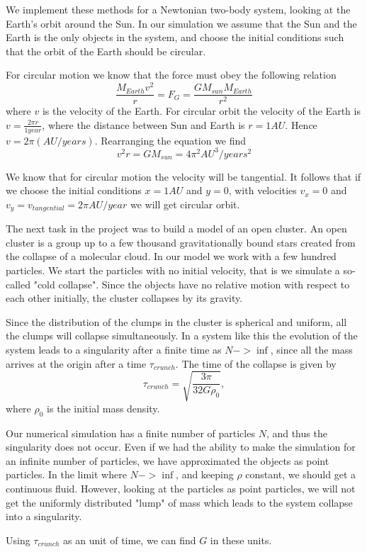 \documentclass[a4paper,12pt, english]{article}
\begin{document}
We implement these methods for a Newtonian two-body system, looking at the Earth's orbit around the Sun. In our simulation we assume that the Sun and the Earth is the only objects in the system, and choose the initial conditions such that the orbit of the Earth should be circular.

For circular motion we know that the force must obey the following relation
$$\frac{M_{Earth}v^2}{r} = F_G = \frac{GM_{sun}M_{Earth}}{r^2}$$ where $v$ is the velocity of the Earth.
For circular orbit the velocity of the Earth is $v = \frac{2 \pi r}{1 year}$, where the distance between Sun and Earth is $r = 1 AU$. Hence $v = 2 \pi (AU/years)$. Rearranging the equation we find
$$v^2r = GM_{sun} = 4 \pi ^2 AU^3/years^2$$

We know that for circular motion the velocity will be tangential. It follows that if we choose the initial conditions $ x = 1 AU $ and $ y = 0$, with velocities $v_x = 0$ and $v_y = v_{tangential} = 2 \pi AU/year$ we will get circular orbit.

The next task in the project was to build a model of an open cluster. An open cluster is a group up to a few thousand gravitationally bound stars created from the collapse of a molecular cloud. In our model we work with a few hundred particles. We start the particles with no initial velocity, that is we simulate a so-called "cold collapse". Since the objects have no relative motion with respect to each other initially, the cluster collapses by its gravity.

Since the distribution of the clumps in the cluster is spherical and uniform, all the clumps will collapse simultaneously.
In a system like this the evolution of the system leads to a singularity after a finite time as $N -> \inf$, since all the mass arrives at the origin after a time $\tau_{crunch}$. The time of the collapse is given by $$\tau_{crunch} = \sqrt{\frac{3 \pi}{32G \rho_0}},$$ where $\rho_0$ is the initial mass density.

Our numerical simulation has a finite number of particles $N$, and thus the singularity does not occur. Even if we had the ability to make the simulation for an infinite number of particles, we have approximated the objects as point particles. In the limit where $N -> \inf$, and keeping $\rho$ constant, we should get a continuous fluid. However, looking at the particles as point particles, we will not get the uniformly distributed "lump" of mass which leads to the system collapse into a singularity.

Using $\tau_{crunch}$ as an unit of time, we can find $G$ in these units.
\end{document}
